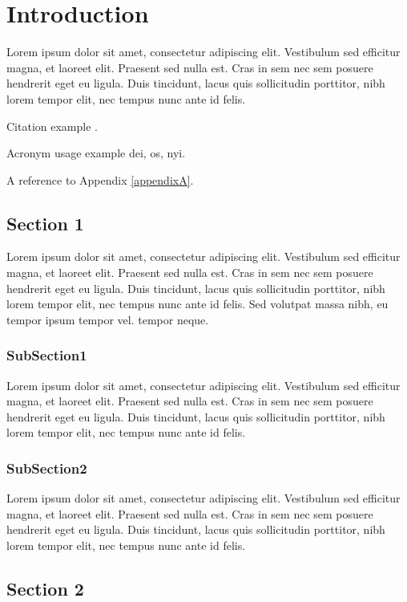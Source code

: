 \chapter{Introduction}
\label{sec:introduction}

Lorem ipsum dolor sit amet, consectetur adipiscing elit. Vestibulum sed efficitur magna, et laoreet elit. Praesent sed nulla est. Cras in sem nec sem posuere hendrerit eget eu ligula. Duis tincidunt, lacus quis sollicitudin porttitor, nibh lorem tempor elit, nec tempus nunc ante id felis.

Citation example \cite{oppenheimer_why_2003}. 

Acronym usage example \gls{dei}, \gls{os}, \gls{nyi}.

A reference to Appendix \ref{appendixA}.

\section{Section 1}
\label{subsec:sec1}

Lorem ipsum dolor sit amet, consectetur adipiscing elit. Vestibulum sed efficitur magna, et laoreet elit. Praesent sed nulla est. Cras in sem nec sem posuere hendrerit eget eu ligula. Duis tincidunt, lacus quis sollicitudin porttitor, nibh lorem tempor elit, nec tempus nunc ante id felis. Sed volutpat massa nibh, eu tempor ipsum tempor vel. tempor neque.


\subsection{SubSection1}

Lorem ipsum dolor sit amet, consectetur adipiscing elit. Vestibulum sed efficitur magna, et laoreet elit. Praesent sed nulla est. Cras in sem nec sem posuere hendrerit eget eu ligula. Duis tincidunt, lacus quis sollicitudin porttitor, nibh lorem tempor elit, nec tempus nunc ante id felis.

\subsection{SubSection2}

Lorem ipsum dolor sit amet, consectetur adipiscing elit. Vestibulum sed efficitur magna, et laoreet elit. Praesent sed nulla est. Cras in sem nec sem posuere hendrerit eget eu ligula. Duis tincidunt, lacus quis sollicitudin porttitor, nibh lorem tempor elit, nec tempus nunc ante id felis.

\section{Section 2}
\label{subsec:sec2}

